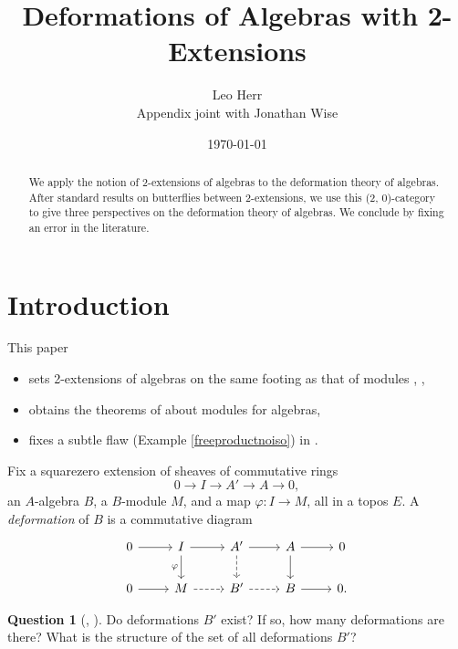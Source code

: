 \documentclass[11pt,reqno]{amsart}
\title[Deformations of Algebras]{Deformations of Algebras with 2-Extensions}
\author[Leo Herr]{Leo Herr \\ Appendix joint with Jonathan Wise}
\date{\today}
\theoremstyle{definition}
\newtheorem{question}[theorem]{Question}
\newcommand{\onlyinsubfile}[1]{#1}
\newcommand{\notinsubfile}[1]{}
\begin{document}
\maketitle



\renewcommand{\onlyinsubfile}[1]{}
\renewcommand{\notinsubfile}[1]{#1}





\setcounter{section}{-1}



\begin{abstract}
We apply the notion of 2-extensions of algebras to the deformation theory of algebras. After standard results on butterflies between 2-extensions, we use this (2, 0)-category to give three perspectives on the deformation theory of algebras. We conclude by fixing an error in the literature. 
\end{abstract}





\section{Introduction}


This paper
\begin{itemize}
    \item sets 2-extensions of algebras on the same footing as that of modules \cite{mymoduledefms}, \cite{wisebutterflies},
    \item obtains the theorems of \cite{mymoduledefms} about modules for algebras,
    \item fixes a subtle flaw (Example \ref{freeproductnoiso}) in \cite{wisealgs1}.
\end{itemize}


Fix a squarezero extension of sheaves of commutative rings
\[0 \to I \to A' \to A \to 0,\]
an $A$-algebra $B$, a $B$-module $M$, and a map $\varphi : I \to M$, all in a topos $E$. 
A \textit{deformation} of $B$ is a commutative diagram 
\[\begin{tikzcd}
0 \ar[r] &I \ar[r] \ar[d, "\varphi", swap] &A' \ar[r] \ar[d, dashed]  &A \ar[r] \ar[d]  &0 \\
0 \ar[r] &M \ar[r, dashed] &B' \ar[r, dashed] &B \ar[r] &0.
\end{tikzcd}\]

\begin{question}[{\cite{gerstenhaber1}, \cite[\S 2.1.1]{illusie1}}]\label{q:howmanydefms?}
Do deformations $B'$ exist? If so, how many deformations are there? What is the structure of the set of all deformations $B'$? 
\end{question}
\end{document}

